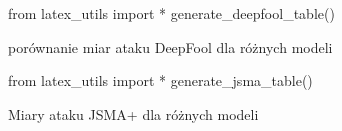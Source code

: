 \documentclass[
    left=2.5cm,         %
    right=2.5cm,        %
    top=2.5cm,          %
    bottom=3cm,         %
    bindingoffset=6mm,  %
    nohyphenation=false %
]{eiti/eiti-thesis}
\begin{document}
\begin{table}[H]
\begin{adjustbox}{max width=\textwidth}
\begin{pycode}
from latex_utils import *
generate_deepfool_table()
\end{pycode}
\end{adjustbox}
\caption{porównanie miar ataku DeepFool dla różnych modeli}
\end{table}



\begin{table}[H]
\begin{adjustbox}{max width=\textwidth}
\begin{pycode}
from latex_utils import *
generate_jsma_table()
\end{pycode}
\end{adjustbox}
\caption{Miary ataku JSMA+ dla różnych modeli}
\end{table}







\end{document}
